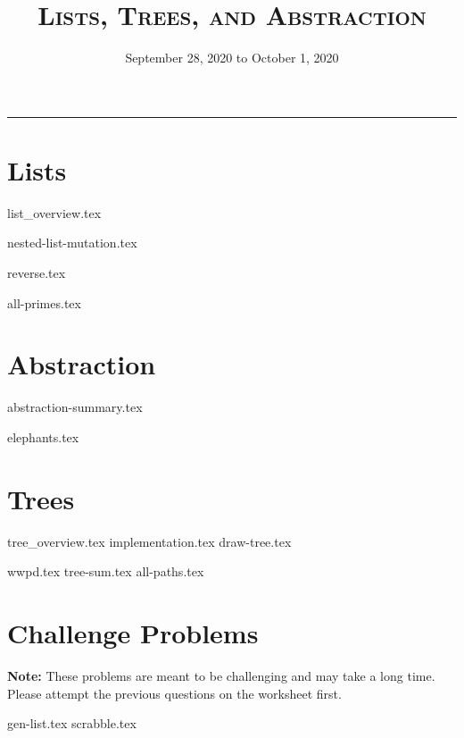 \documentclass{exam}
\title{\textsc{Lists, Trees, and Abstraction}}
\date{September 28, 2020 to October 1, 2020}
\begin{document}
\maketitle
\rule{\textwidth}{0.15em}
\fontsize{12}{15}\selectfont


\section{Lists}
{list_overview.tex}
\begin{questions}
{nested-list-mutation.tex}

\begin{blocksection}
{reverse.tex}
\end{blocksection}

\begin{blocksection}
{all-primes.tex}
\end{blocksection}
\end{questions}

\newpage
\section{Abstraction}
{abstraction-summary.tex}
\begin{questions}
{elephants.tex}
\end{questions}

\newpage
\section{Trees}
{tree_overview.tex}
{implementation.tex}
{draw-tree.tex}
\begin{questions}
{wwpd.tex}
{tree-sum.tex}
{all-paths.tex}
\end{questions}

\newpage
\section{Challenge Problems}
\textbf{Note:} These problems are meant to be challenging and may take a long time. Please attempt the previous questions on the worksheet first.
\begin{questions}
{gen-list.tex}
\newpage
{scrabble.tex}
\end{questions}
\end{document}
